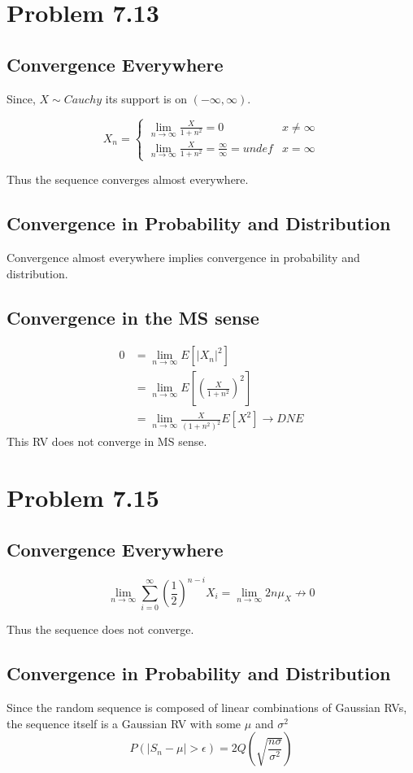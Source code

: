 \documentclass[12pt]{article}
\begin{document}
\section{Problem 7.13}
\subsection{Convergence Everywhere}
Since, $X \sim Cauchy$ its support is on $(-\infty,\infty)$.

\[
  X_n = 
\begin{cases}
  \lim_{n\to\infty} \frac{X}{1+n^2} = 0 & x \neq \infty \\ 
  \lim_{n\to\infty} \frac{X}{1+n^2} = \frac{\infty}{\infty} = undef & x = \infty
\end{cases}
\] 

Thus the sequence converges almost everywhere.

\subsection{Convergence in Probability and Distribution}
Convergence almost everywhere implies convergence in probability and distribution.

\subsection{Convergence in the MS sense}
\begin{align*}
  0 &= \lim_{n\to\infty} E\left[ |X_n|^2 \right] \\
  &= \lim_{n\to\infty} E\left[ \left(\frac{X}{1+n^2}\right)^2 \right] \\
  &= \lim_{n\to\infty} \frac{X}{(1+n^2)^2} E[ X^2 ] \to DNE
\end{align*}
This RV does not converge in MS sense. 

\section{Problem 7.15}
\subsection{Convergence Everywhere}

\[
  \lim_{n\to\infty} \sum_{i=0}^{\infty} \left( \frac{1}{2} \right)^{n-i} X_i =
  \lim_{n\to\infty} 2n\mu_X \nrightarrow 0
\] 

Thus the sequence does not converge.

\subsection{Convergence in Probability and Distribution}
Since the random sequence is composed of linear combinations of Gaussian RVs, the 
sequence itself is a Gaussian RV with some $\mu$ and $\sigma^2$
\[
  P(|S_n - \mu| > \epsilon) = 2Q\left( \sqrt{\frac{n\sigma}{\sigma^2}} \right)
\]
\end{document}
